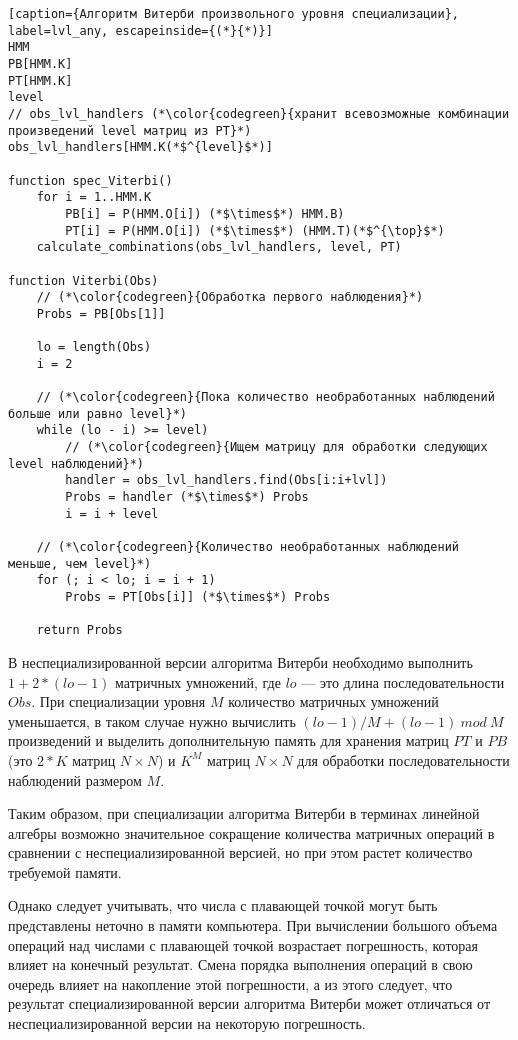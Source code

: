 \begin{lstlisting}[caption={Алгоритм Витерби произвольного уровня специализации}, label=lvl_any, escapeinside={(*}{*)}]
HMM
PB[HMM.K]
PT[HMM.K]
level
// obs_lvl_handlers (*\color{codegreen}{хранит всевозможные комбинации произведений level матриц из PT}*)
obs_lvl_handlers[HMM.K(*$^{level}$*)]

function spec_Viterbi()
	for i = 1..HMM.K
		PB[i] = P(HMM.O[i]) (*$\times$*) HMM.B)
		PT[i] = P(HMM.O[i]) (*$\times$*) (HMM.T)(*$^{\top}$*)
	calculate_combinations(obs_lvl_handlers, level, PT)

function Viterbi(Obs)
	// (*\color{codegreen}{Обработка первого наблюдения}*)
	Probs = PB[Obs[1]]

	lo = length(Obs)
	i = 2

	// (*\color{codegreen}{Пока количество необработанных наблюдений больше или равно level}*)
	while (lo - i) >= level)
		// (*\color{codegreen}{Ищем матрицу для обработки следующих level наблюдений}*)
		handler = obs_lvl_handlers.find(Obs[i:i+lvl])
		Probs = handler (*$\times$*) Probs
		i = i + level
	
	// (*\color{codegreen}{Количество необработанных наблюдений меньше, чем level}*)
	for (; i < lo; i = i + 1)
		Probs = PT[Obs[i]] (*$\times$*) Probs

	return Probs
\end{lstlisting}
В неспециализированной версии алгоритма Витерби необходимо 
выполнить $1 + 2 * (lo - 1)$ матричных умножений, где $lo$ 
--- это длина последовательности $Obs$.
При специализации уровня $M$ количество 
матричных умножений уменьшается, в таком случае нужно 
вычислить $\mathit{(lo - 1) / M + (lo - 1)\ mod\ M}$ 
произведений и выделить дополнительную память для хранения 
матриц $PT$ и $PB$ (это $2 * K$ матриц $N \times N$) и $K^{M}$ матриц $N 
\times N$ для обработки последовательности наблюдений 
размером $M$.

Таким образом, при специализации алгоритма Витерби в 
терминах линейной алгебры возможно значительное сокращение 
количества матричных операций в сравнении с 
неспециализированной версией, но при этом растет количество 
требуемой памяти.

Однако следует учитывать, что числа с плавающей точкой могут 
быть представлены неточно в памяти компьютера.
При вычислении большого объема операций над 
числами с плавающей точкой возрастает погрешность, которая 
влияет на конечный результат.
Смена порядка выполнения операций в свою очередь влияет на 
накопление этой погрешности, а из этого следует, что
результат специализированной версии алгоритма Витерби может 
отличаться от неспециализированной версии на некоторую 
погрешность.

